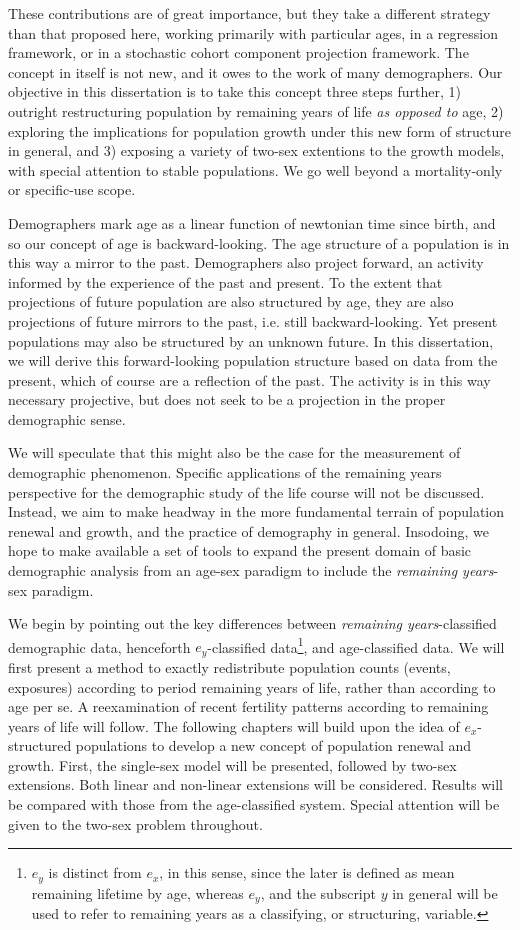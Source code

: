  These contributions are of great importance, but they take a different 
 strategy than that proposed here, working primarily with particular ages, in a 
 regression framework, or in a stochastic cohort component projection framework.
 The concept in itself is not new, and it owes to the work of many demographers.
 Our objective in this dissertation is to take this concept three steps 
 further, 1) outright restructuring population by remaining years of life \textit{as
 opposed to} age, 2) exploring the implications for population growth under this
 new form of structure in general, and 3) exposing a variety of two-sex
 extentions to the growth models, with special attention to stable populations.
 We go well beyond a mortality-only or specific-use scope.

Demographers mark age as a linear function of newtonian time since
birth, and so our concept of age is backward-looking. The age
structure of a population is in this way a mirror to the past. Demographers also project
forward, an activity informed by the experience of the past and present. To the
extent that projections of future population are also structured by age,
they are also projections of future mirrors to the past, i.e. still
backward-looking. Yet present populations may also be structured by an unknown
future. In this dissertation, we will derive this forward-looking population 
structure based on data from the present, which of course are a reflection 
of the past. The activity is in this way necessary projective, but does not 
seek to be a projection in the proper demographic sense.

We will speculate that this might also be
the case for the measurement of demographic phenomenon. Specific applications of
the remaining years perspective for the demographic study of the life course
will not be discussed. Instead, we aim to make headway in the more fundamental terrain of
population renewal and growth, and the practice of demography in general.
Insodoing, we hope to make available a set of tools to expand the present domain
of basic demographic analysis from an age-sex paradigm to include the
\textit{remaining years}-sex paradigm.

We begin by pointing out the key differences
between \textit{remaining years}-classified demographic data,
henceforth $e_y$-classified data\footnote{$e_y$ is distinct from $e_x$, in
this sense, since the later is defined as mean remaining lifetime by age,
whereas $e_y$, and the subscript $y$ in general will be used to refer to
remaining years as a classifying, or structuring, variable.}, and age-classified
data. We will first present a method to exactly redistribute population counts (events, exposures) according to period remaining years of life, rather than according to age per se. A reexamination of recent fertility patterns according to remaining years of life will follow. The following chapters will build upon the idea of $e_x$-structured populations
to develop a new concept of population renewal and growth. First, the single-sex
model will be presented, followed by two-sex extensions. Both linear and
non-linear extensions will be considered. Results will be compared with those
from the age-classified system. Special attention will be given to the two-sex
problem throughout.


